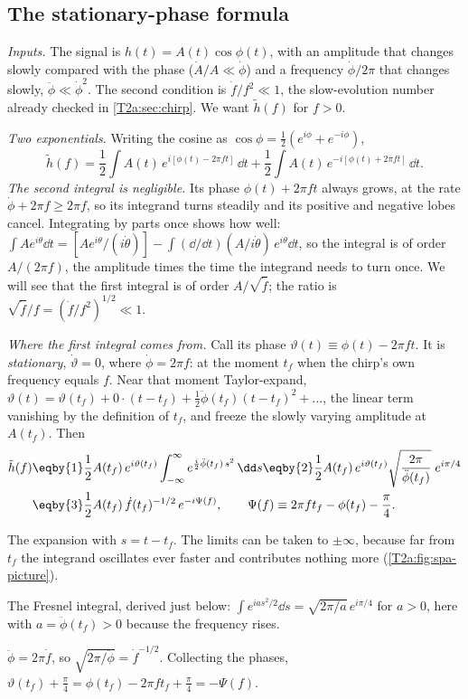 \subsection{The stationary-phase formula}

\emph{Inputs.} The signal is $h(t)=A(t)\cos\phi(t)$, with an amplitude that changes slowly compared with the phase ($\dot A/A\ll\dot\phi$) and a frequency $\dot\phi/2\pi$ that changes slowly, $\ddot\phi\ll\dot\phi^2$. The second condition is $\dot f/f^2\ll1$, the slow-evolution number already checked in \cref{T2a:sec:chirp}. We want $\tilde h(f)$ for $f>0$.

\emph{Two exponentials.} Writing the cosine as $\cos\phi=\tfrac12(e^{i\phi}+e^{-i\phi})$,
\begin{equation}
  \tilde h(f)=\frac12\int A(t)\,e^{i[\phi(t)-2\pi ft]}\,\dd t+\frac12\int A(t)\,e^{-i[\phi(t)+2\pi ft]}\,\dd t .
  \label{T2g:eq:two-exp}
\end{equation}
\emph{The second integral is negligible.} Its phase $\phi(t)+2\pi ft$ always grows, at the rate $\dot\phi+2\pi f\ge2\pi f$, so its integrand turns steadily and its positive and negative lobes cancel. Integrating by parts once shows how well: $\int Ae^{i\theta}\dd t=[Ae^{i\theta}/(i\dot\theta)]-\int(\dd/\dd t)(A/i\dot\theta)\,e^{i\theta}\dd t$, so the integral is of order $A/(2\pi f)$, the amplitude times the time the integrand needs to turn once. We will see that the first integral is of order $A/\sqrt{\dot f}$; the ratio is $\sqrt{\dot f}/f=(\dot f/f^2)^{1/2}\ll1$.

\emph{Where the first integral comes from.} Call its phase $\vartheta(t)\equiv\phi(t)-2\pi ft$. It is \emph{stationary}, $\dot\vartheta=0$, where $\dot\phi=2\pi f$: at the moment $t_f$ when the chirp's own frequency equals $f$. Near that moment Taylor-expand, $\vartheta(t)=\vartheta(t_f)+0\cdot(t-t_f)+\tfrac12\ddot\phi(t_f)(t-t_f)^2+\dots$, the linear term vanishing by the definition of $t_f$, and freeze the slowly varying amplitude at $A(t_f)$. Then
\begin{align}
  \tilde h(f)
  &\eqby{1}\frac12A(t_f)\,e^{i\vartheta(t_f)}\int_{-\infty}^{\infty}e^{\frac i2\ddot\phi(t_f)\,s^2}\,\dd s
  \eqby{2}\frac12A(t_f)\,e^{i\vartheta(t_f)}\sqrt{\frac{2\pi}{\ddot\phi(t_f)}}\;e^{i\pi/4}\nonumber\\
  &\eqby{3}\frac12A(t_f)\,\dot f(t_f)^{-1/2}\,e^{-i\Psi(f)},\qquad
  \Psi(f)\equiv2\pi ft_f-\phi(t_f)-\frac\pi4 .\label{T2a:eq:spa}
\end{align}
\begin{explain}
  \item The expansion with $s=t-t_f$. The limits can be taken to $\pm\infty$, because far from $t_f$ the integrand oscillates ever faster and contributes nothing more (\cref{T2a:fig:spa-picture}).
  \item The Fresnel integral, derived just below: $\int e^{ias^2/2}\dd s=\sqrt{2\pi/a}\,e^{i\pi/4}$ for $a>0$, here with $a=\ddot\phi(t_f)>0$ because the frequency rises.
  \item $\ddot\phi=2\pi\dot f$, so $\sqrt{2\pi/\ddot\phi}=\dot f^{-1/2}$. Collecting the phases, $\vartheta(t_f)+\tfrac\pi4=\phi(t_f)-2\pi ft_f+\tfrac\pi4=-\Psi(f)$.
\end{explain}

